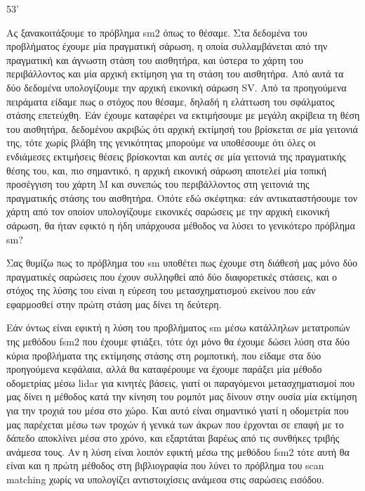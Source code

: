 \documentclass[a4paper,10pt]{article}
\begin{document}
53'



Ας ξανακοιτάξουμε το πρόβλημα sm2 όπως το θέσαμε. Στα δεδομένα του προβλήματος
έχουμε μία πραγματική σάρωση, η οποία συλλαμβάνεται από την πραγματική και
άγνωστη στάση του αισθητήρα, και ύστερα το χάρτη του περιβάλλοντος και μία
αρχική εκτίμηση για τη στάση του αισθητήρα. Από αυτά τα δύο δεδομένα υπολογίζουμε
την αρχική εικονική σάρωση SV. Από τα προηγούμενα πειράματα είδαμε πως ο
στόχος που θέσαμε, δηλαδή η ελάττωση του σφάλματος στάσης επετεύχθη. Εάν έχουμε
καταφέρει να εκτιμήσουμε με μεγάλη ακρίβεια τη θέση του αισθητήρα, δεδομένου
ακριβώς ότι αρχική εκτίμησή του βρίσκεται σε μία γειτονιά της, τότε χωρίς
βλάβη της γενικότητας μπορούμε να υποθέσουμε ότι όλες οι ενδιάμεσες εκτιμήσεις
θέσεις βρίσκονται και αυτές σε μία γειτονιά της πραγματικής θέσης του, και,
πιο σημαντικό, η αρχική εικονική σάρωση αποτελεί μία τοπική προσέγγιση του
χάρτη M και συνεπώς του περιβάλλοντος στη γειτονιά της πραγματικής στάσης του
αισθητήρα. Οπότε εδώ σκέφτηκα: εάν αντικαταστήσουμε τον χάρτη από τον οποίον
υπολογίζουμε εικονικές σαρώσεις με την αρχική εικονική σάρωση, θα ήταν εφικτό
η ήδη υπάρχουσα μέθοδος να λύσει το γενικότερο πρόβλημα sm?

Σας θυμίζω πως το πρόβλημα του sm υποθέτει πως έχουμε στη διάθεσή μας μόνο
δύο πραγματικές σαρώσεις που έχουν συλληφθεί από δύο διαφορετικές στάσεις, και
ο στόχος της λύσης του είναι η εύρεση του μετασχηματισμού εκείνου που εάν
εφαρμοσθεί στην πρώτη στάση μας δίνει τη δεύτερη.

Εάν όντως είναι εφικτή η λύση του προβλήματος sm μέσω κατάλληλων μετατροπών της
μεθόδου fsm2 που έχουμε φτιάξει, τότε όχι μόνο θα έχουμε δώσει λύση στα δύο
κύρια προβλήματα της εκτίμησης στάσης στη ρομποτική, που είδαμε στα δύο
προηγούμενα κεφάλαια, αλλά θα καταφέρουμε να έχουμε παράξει μία μέθοδο
οδομετρίας μέσω lidar για κινητές βάσεις, γιατί οι παραγόμενοι μετασχηματισμοί
που μας δίνει η μέθοδος κατά την κίνηση του ρομπότ μας δίνουν στην ουσία μία
εκτίμηση για την τροχιά του μέσα στο χώρο. Και αυτό είναι σημαντικό γιατί
η οδομετρία που μας παρέχεται μέσω των τροχών ή γενικά των άκρων που έρχονται
σε επαφή με το δάπεδο αποκλίνει μέσα στο χρόνο, και εξαρτάται βαρέως από τις
συνθήκες τριβής ανάμεσα τους. Αν η λύση είναι λοιπόν εφικτή μέσω της μεθόδου
fsm2 τότε αυτή θα είναι και η πρώτη μέθοδος στη βιβλιογραφία που λύνει το
πρόβλημα του scan matching χωρίς να υπολογίζει αντιστοιχίσεις ανάμεσα στις
σαρώσεις εισόδου.
\end{document}
